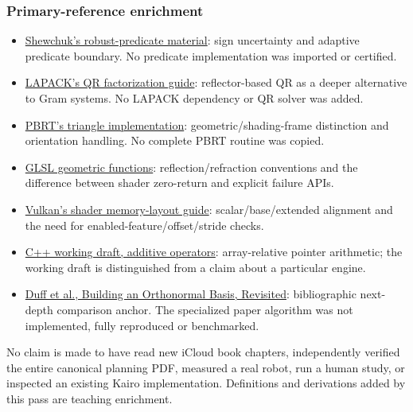 \subsubsection{Primary-reference enrichment}\label{appendix-a103e7846d21-primary-reference-enrichment-1}

\hypertarget{appendix-a103e7846d21-primary-reference-enrichment-1}{}

\begin{itemize}
\tightlist
\item
  \href{https://www.cs.cmu.edu/~quake/robust.html}{Shewchuk's robust-predicate material}: sign uncertainty and adaptive predicate boundary. No predicate implementation was imported or certified.
\item
  \href{https://www.netlib.org/lapack/lug/node40.html}{LAPACK's QR factorization guide}: reflector-based QR as a deeper alternative to Gram systems. No LAPACK dependency or QR solver was added.
\item
  \href{https://www.pbr-book.org/4ed/Shapes/Triangle_Meshes}{PBRT's triangle implementation}: geometric/shading-frame distinction and orientation handling. No complete PBRT routine was copied.
\item
  \href{https://registry.khronos.org/OpenGL/specs/gl/GLSLangSpec.4.60.html\#geometric-functions}{GLSL geometric functions}: reflection/refraction conventions and the difference between shader zero-return and explicit failure APIs.
\item
  \href{https://docs.vulkan.org/guide/latest/shader_memory_layout.html}{Vulkan's shader memory-layout guide}: scalar/base/extended alignment and the need for enabled-feature/offset/stride checks.
\item
  \href{https://eel.is/c++draft/expr.add}{C++ working draft, additive operators}: array-relative pointer arithmetic; the working draft is distinguished from a claim about a particular engine.
\item
  \href{https://graphics.pixar.com/library/OrthonormalB/paper.pdf}{Duff et al., Building an Orthonormal Basis, Revisited}: bibliographic next-depth comparison anchor. The specialized paper algorithm was not implemented, fully reproduced or benchmarked.
\end{itemize}

No claim is made to have read new iCloud book chapters, independently verified the entire canonical planning PDF, measured a real robot, run a human study, or inspected an existing Kairo implementation. Definitions and derivations added by this pass are teaching enrichment.

